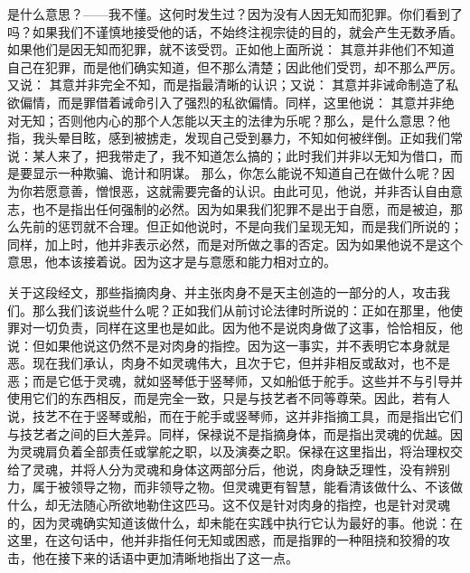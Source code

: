 是什么意思？——我不懂。这何时发生过？因为没有人因无知而犯罪。你们看到了吗？如果我们不谨慎地接受他的话，不始终注视宗徒的目的，就会产生无数矛盾。如果他们是因无知而犯罪，就不该受罚。正如他上面所说： 其意并非他们不知道自己在犯罪，而是他们确实知道，但不那么清楚；因此他们受罚，却不那么严厉。又说： 其意并非完全不知，而是指最清晰的认识；又说： 其意并非诫命制造了私欲偏情，而是罪借着诫命引入了强烈的私欲偏情。同样，这里他说： 其意并非绝对无知；否则他内心的那个人怎能以天主的法律为乐呢？那么，是什么意思？他指，我头晕目眩，感到被掳走，发现自己受到暴力，不知如何被绊倒。正如我们常说：某人来了，把我带走了，我不知道怎么搞的；此时我们并非以无知为借口，而是要显示一种欺骗、诡计和阴谋。 那么，你怎么能说不知道自己在做什么呢？因为你若愿意善，憎恨恶，这就需要完备的认识。由此可见，他说，并非否认自由意志，也不是指出任何强制的必然。因为如果我们犯罪不是出于自愿，而是被迫，那么先前的惩罚就不合理。但正如他说时，不是向我们呈现无知，而是我们所说的；同样，加上时，他并非表示必然，而是对所做之事的否定。因为如果他说不是这个意思，他本该接着说。因为这才是与意愿和能力相对立的。 \par

关于这段经文，那些指摘肉身、并主张肉身不是天主创造的一部分的人，攻击我们。那么我们该说些什么呢？正如我们从前讨论法律时所说的：正如在那里，他使罪对一切负责，同样在这里也是如此。因为他不是说肉身做了这事，恰恰相反，他说：但如果他说这仍然不是对肉身的指控。因为这一事实，并不表明它本身就是恶。现在我们承认，肉身不如灵魂伟大，且次于它，但并非相反或敌对，也不是恶；而是它低于灵魂，就如竖琴低于竖琴师，又如船低于舵手。这些并不与引导并使用它们的东西相反，而是完全一致，只是与技艺者不同等尊荣。因此，若有人说，技艺不在于竖琴或船，而在于舵手或竖琴师，这并非指摘工具，而是指出它们与技艺者之间的巨大差异。同样，保禄说不是指摘身体，而是指出灵魂的优越。因为灵魂肩负着全部责任或掌舵之职，以及演奏之职。保禄在这里指出，将治理权交给了灵魂，并将人分为灵魂和身体这两部分后，他说，肉身缺乏理性，没有辨别力，属于被领导之物，而非领导之物。但灵魂更有智慧，能看清该做什么、不该做什么，却无法随心所欲地勒住这匹马。这不仅是针对肉身的指控，也是针对灵魂的，因为灵魂确实知道该做什么，却未能在实践中执行它认为最好的事。他说：在这里，在这句话中，他并非指任何无知或困惑，而是指罪的一种阻挠和狡猾的攻击，他在接下来的话语中更加清晰地指出了这一点。\par

